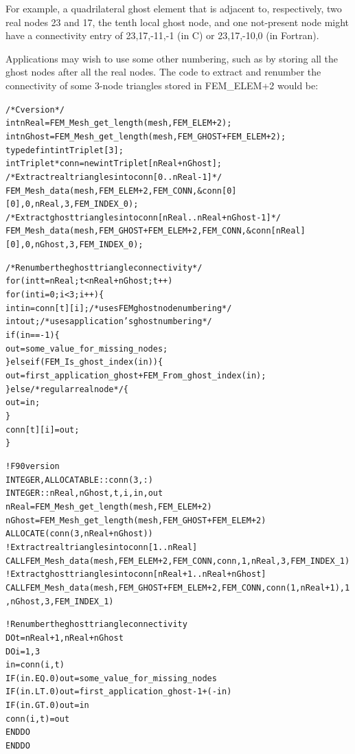 For example, a quadrilateral ghost element that is adjacent to, respectively, two real 
nodes 23 and 17, the tenth local ghost node, and one not-present node might have a 
connectivity entry of {23,17,-11,-1} (in C) or {23,17,-10,0} (in Fortran).

Applications may wish to use some other numbering,
such as by storing all the ghost nodes after all the real nodes.
The code to extract and renumber the connectivity of some 3-node triangles 
stored in FEM\_ELEM+2 would be:

\begin{alltt}
/* C version */
  int nReal=FEM\_Mesh\_get\_length(mesh,FEM\_ELEM+2);
  int nGhost=FEM\_Mesh\_get\_length(mesh,FEM\_GHOST+FEM\_ELEM+2);
  typedef int intTriplet[3];
  intTriplet *conn=new intTriplet[nReal+nGhost];
  /* Extract real triangles into conn[0..nReal-1] */
  FEM\_Mesh\_data(mesh,FEM\_ELEM+2,FEM\_CONN, &conn[0][0], 0,nReal, 3,FEM\_INDEX\_0);
  /* Extract ghost triangles into conn[nReal..nReal+nGhost-1] */
  FEM\_Mesh\_data(mesh,FEM\_GHOST+FEM\_ELEM+2,FEM\_CONN, &conn[nReal][0], 0,nGhost, 3,FEM\_INDEX\_0);
  
  /* Renumber the ghost triangle connectivity */
  for (int t=nReal;t<nReal+nGhost;t++)
    for (int i=0;i<3;i++) \{
      int in=conn[t][i]; /* uses FEM ghost node numbering */
      int out; /* uses application's ghost numbering */
      if (in==-1) \{ 
        out=some\_value\_for\_missing\_nodes; 
      \} else if (FEM\_Is\_ghost\_index(in)) \{
        out=first\_application\_ghost+FEM\_From\_ghost\_index(in);
      \} else /*regular real node*/ \{
        out=in;
      \}
      conn[t][i]=out;
    \}

! F90 version
  INTEGER, ALLOCATABLE :: conn(3,:)
  INTEGER :: nReal,nGhost,t,i,in,out
  nReal=FEM\_Mesh\_get\_length(mesh,FEM\_ELEM+2)
  nGhost=FEM\_Mesh\_get\_length(mesh,FEM\_GHOST+FEM\_ELEM+2)
  ALLOCATE(conn(3,nReal+nGhost))
  ! Extract real triangles into conn[1..nReal] 
  CALL FEM\_Mesh\_data(mesh,FEM\_ELEM+2,FEM\_CONN, conn, 1,nReal, 3,FEM\_INDEX\_1)
  ! Extract ghost triangles into conn[nReal+1..nReal+nGhost] 
  CALL FEM\_Mesh\_data(mesh,FEM\_GHOST+FEM\_ELEM+2,FEM\_CONN, conn(1,nReal+1), 1,nGhost, 3,FEM\_INDEX\_1)
  
  ! Renumber the ghost triangle connectivity 
  DO t=nReal+1,nReal+nGhost
    DO i=1,3
      in=conn(i,t) 
      IF (in .EQ. 0) out=some\_value\_for\_missing\_nodes
      IF (in .LT. 0) out=first\_application\_ghost-1+(-in)
      IF (in .GT. 0) out=in
      conn(i,t)=out
    END DO
  END DO
  
  
\end{alltt}



